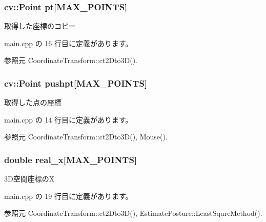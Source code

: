 \subsubsection[{pt}]{\setlength{\rightskip}{0pt plus 5cm}cv\-::\-Point pt[{\bf M\-A\-X\-\_\-\-P\-O\-I\-N\-T\-S}]}\label{_estimate_posture_8h_ac962128d9435beddc43ca532882deef2}


取得した座標のコピー 



 main.\-cpp の 16 行目に定義があります。



参照元 Coordinate\-Transform\-::ct2\-Dto3\-D().

\subsubsection[{pushpt}]{\setlength{\rightskip}{0pt plus 5cm}cv\-::\-Point pushpt[{\bf M\-A\-X\-\_\-\-P\-O\-I\-N\-T\-S}]}\label{_estimate_posture_8h_af77f32fe5be4d28ae0d320adde8f51af}


取得した点の座標 



 main.\-cpp の 14 行目に定義があります。



参照元 Coordinate\-Transform\-::ct2\-Dto3\-D(), Mouse().

\subsubsection[{real\-\_\-x}]{\setlength{\rightskip}{0pt plus 5cm}double real\-\_\-x[{\bf M\-A\-X\-\_\-\-P\-O\-I\-N\-T\-S}]}\label{_estimate_posture_8h_a3a44d2bc2273e220bc5ade2bc217d33a}


3\-D空間座標の\-X 



 main.\-cpp の 19 行目に定義があります。



参照元 Coordinate\-Transform\-::ct2\-Dto3\-D(), Estimate\-Posture\-::\-Least\-Squre\-Method().

